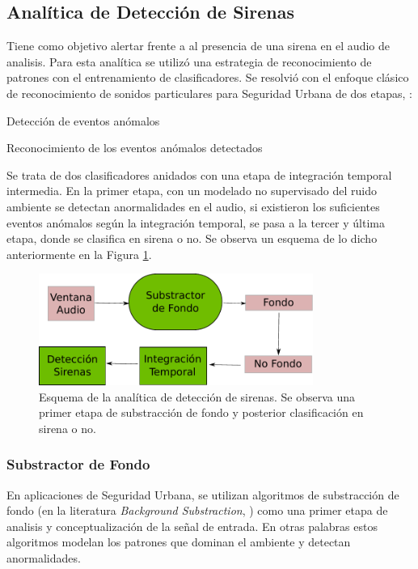 \documentclass{article}
\begin{document}
\subsection{Analítica de Detección de Sirenas}
\label{deteccion de sirenas}
Tiene como objetivo alertar frente a al presencia de una sirena en el audio de analisis. Para esta analítica se utilizó una estrategia de reconocimiento de patrones con el entrenamiento de clasificadores. Se resolvió con el enfoque clásico de reconocimiento de sonidos particulares para Seguridad Urbana de dos etapas, \cite{lecomte2011abnormal}:
\begin{enumerate}
\begin{item}
Detección de eventos anómalos
\end{item}
\begin{item}
Reconocimiento de los eventos anómalos detectados
\end{item}
\end{enumerate}

Se trata de dos clasificadores anidados con una etapa de integración temporal intermedia. En la primer etapa, con un modelado no supervisado del ruido ambiente se detectan anormalidades en el audio, si existieron los suficientes eventos anómalos según la integración temporal, se pasa a la tercer y última etapa, donde se clasifica en sirena o no. Se observa un esquema de lo dicho anteriormente en la Figura \ref{fig:deteccion_sirenas}. 
 
\begin{figure}[h]
\begin{center}
\includegraphics[width=0.8\textwidth]{deteccion_sirenas} 
\caption{Esquema de la analítica de detección de sirenas. Se observa una primer etapa de substracción de fondo y posterior clasificación en sirena o no.}
\label{fig:deteccion_sirenas}
\end{center}
\end{figure}

\subsubsection{Substractor de Fondo}
En aplicaciones de Seguridad Urbana, se utilizan algoritmos de substracción de fondo (en la literatura \textit{Background Substraction}, \cite{Crocco:2016:ASS:2891449.2871183}) como una primer etapa de analisis y conceptualización de la señal de entrada. En otras palabras estos algoritmos modelan los patrones que dominan el ambiente y detectan anormalidades.
\smallskip 
\end{document}
